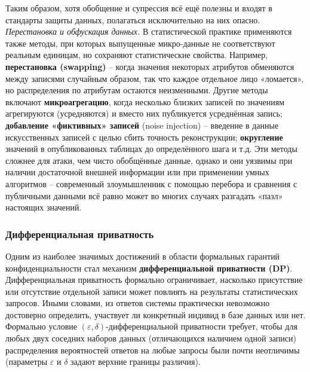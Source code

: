 Таким образом, хотя обобщение и супрессия всё ещё
полезны и входят в стандарты защиты данных, полагаться исключительно на них опасно. \textit{Перестановка и обфускация
данных.} В статистической практике применяются также методы, при которых выпущенные микро-данные не соответствуют
реальным единицам, но сохраняют статистические свойства. Например, \textbf{перестановка (swapping)} – когда значения
некоторых атрибутов обменяются между записями случайным образом, так что каждое отдельное лицо «ломается», но
распределения по атрибутам остаются неизменными. Другие методы включают \textbf{микроагрегацию}, когда несколько близких
записей по значениям агрегируются (усредняются) и вместо них публикуется усреднённая запись; \textbf{добавление
«фиктивных» записей} (noise injection) – введение в данные искусственных записей с целью сбить точность реконструкции;
\textbf{округление} значений в опубликованных таблицах до определённого шага и т.д. Эти методы сложнее для атаки, чем
чисто обобщённые данные, однако и они уязвимы при наличии достаточной внешней информации или при применении умных
алгоритмов – современный злоумышленник с помощью перебора и сравнения с публичными данными всё равно может во многих
случаях разгадать «пазл» настоящих значений.

\subsubsection{Дифференциальная приватность}

\label{sec:dp} Одним из наиболее значимых достижений в области формальных гарантий конфиденциальности стал механизм
\textbf{дифференциальной приватности (DP)}. Дифференциальная приватность формально ограничивает, насколько присутствие
или отсутствие отдельной записи может повлиять на результаты статистических запросов. Иными словами, из ответов системы
практически невозможно достоверно определить, участвует ли конкретный индивид в базе данных или нет. Формально условие
$(\varepsilon,\delta)$-дифференциальной приватности требует, чтобы для любых двух соседних наборов данных (отличающихся
наличием одной записи) распределения вероятностей ответов на любые запросы были почти неотличимы (параметры
$\varepsilon$ и $\delta$ задают верхние границы различия).

